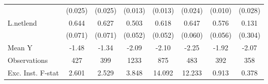 {\begin{tabular}{l*{7}{c}}
            &     (0.025)         &     (0.025)         &     (0.013)         &     (0.013)         &     (0.024)         &     (0.010)         &     (0.028)         \\
\addlinespace
L.netlend   &       0.644\sym{***}&       0.627\sym{***}&       0.503\sym{***}&       0.618\sym{***}&       0.647\sym{***}&       0.576\sym{***}&       0.131         \\
            &     (0.071)         &     (0.071)         &     (0.052)         &     (0.052)         &     (0.060)         &     (0.056)         &     (0.304)         \\
\midrule
Mean Y      &       -1.48         &       -1.34         &       -2.09         &       -2.10         &       -2.25         &       -1.92         &       -2.07         \\
Observations&         427         &         399         &        1233         &         875         &         483         &         392         &         358         \\
Exc. Inst. F-stat&       2.601         &       2.529         &       3.848         &      14.092         &      12.233         &       0.913         &       0.378         \\
\bottomrule
\end{tabular}
}
